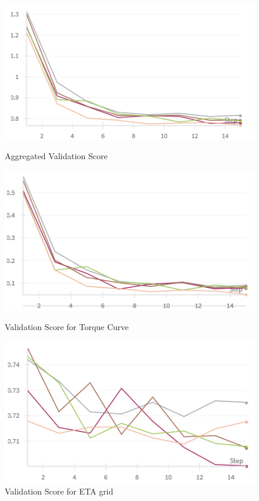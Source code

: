 \documentclass{report} %
\begin{document}
\begin{figure}[H]
    \centering
    \begin{minipage}[b]{0.3\textwidth}
        \includegraphics[width=\textwidth]{./ReportImages/val_score.png}
        \caption{Aggregated Validation Score}
        \label{fig:Aggregated Validation Score}
    \end{minipage}
    \begin{minipage}[b]{0.3\textwidth}
        \includegraphics[width=\textwidth]{./ReportImages/val_score_y1.png}
        \caption{Validation Score for Torque Curve}
        \label{fig:Validation Score for Torque Curve}
    \end{minipage}
    \hfill
    \begin{minipage}[b]{0.3\textwidth}
        \includegraphics[width=\textwidth]{./ReportImages/val_score_y2.png}
        \caption{Validation Score for ETA grid}
        \label{fig:Validation Score for ETA grid}
    \end{minipage}
\end{figure}
\end{document}
